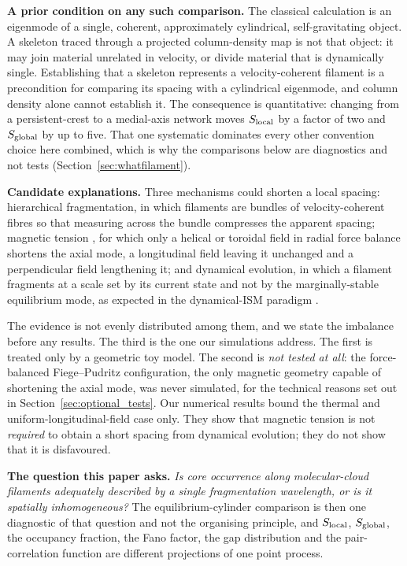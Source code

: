 \documentclass[usenatbib,twoside,twocolumn]{mnras}
\begin{document}
\smallskip\noindent\textbf{A prior condition on any such comparison.} The classical calculation is an eigenmode of a single, coherent, approximately cylindrical, self-gravitating object. A skeleton traced through a projected column-density map is not that object: it may join material unrelated in velocity, or divide material that is dynamically single. Establishing that a skeleton represents a velocity-coherent filament is a precondition for comparing its spacing with a cylindrical eigenmode, and column density alone cannot establish it. The consequence is quantitative: changing from a persistent-crest to a medial-axis network moves $S_{\rm local}$ by a factor of two and $S_{\rm global}$ by up to five. That one systematic dominates every other convention choice here combined, which is why the comparisons below are diagnostics and not tests (Section~\ref{sec:whatfilament}).

\smallskip\noindent\textbf{Candidate explanations.} Three mechanisms could shorten a local spacing: hierarchical fragmentation, in which filaments are bundles of velocity-coherent fibres \citep{Hacar2013,Hacar2018,Yang2024} so that measuring across the bundle compresses the apparent spacing; magnetic tension \citep{Nakamura1993}, for which only a helical or toroidal field in radial force balance shortens the axial mode, a longitudinal field leaving it unchanged and a perpendicular field lengthening it; and dynamical evolution, in which a filament fragments at a scale set by its current state and not by the marginally-stable equilibrium mode, as expected in the dynamical-ISM paradigm \citep{Andre2014,Clarke2016,Clarke2017,Clarke2020}.

The evidence is not evenly distributed among them, and we state the imbalance before any results. The third is the one our simulations address. The first is treated only by a geometric toy model. The second is \emph{not tested at all}: the force-balanced Fiege--Pudritz configuration, the only magnetic geometry capable of shortening the axial mode, was never simulated, for the technical reasons set out in Section~\ref{sec:optional_tests}. Our numerical results bound the thermal and uniform-longitudinal-field case only. They show that magnetic tension is not \emph{required} to obtain a short spacing from dynamical evolution; they do not show that it is disfavoured.

\smallskip\noindent\textbf{The question this paper asks.} \emph{Is core occurrence along molecular-cloud filaments adequately described by a single fragmentation wavelength, or is it spatially inhomogeneous?} The equilibrium-cylinder comparison is then one diagnostic of that question and not the organising principle, and $S_{\rm local}$, $S_{\rm global}$, the occupancy fraction, the Fano factor, the gap distribution and the pair-correlation function are different projections of one point process.
\end{document}
